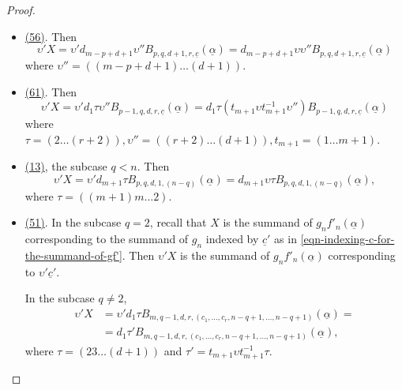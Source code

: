 \documentclass[12pt,a4paper,reqno]{amsart}
\begin{document}
\begin{proof}
\begin{itemize}
$$ \upsilon' X = 
\upsilon' d_{r+1} \tau B_{p, q, d, r,\underline{c}}(\underline{\alpha})
= 
d_{r+1} \tau \upsilon B_{p, q, d,
r,\underline{c}}(\underline{\alpha}), $$
where $\tau = \left((r+1)(r+2)\right)$. 
\item \underline{(56)}. Then 
$$ \upsilon' X = 
\upsilon' d_{m-p+d+1} \upsilon'' B_{p, q, d+1, r, \underline{c}}
(\underline{\alpha})
= d_{m-p+d+1} \upsilon \upsilon'' B_{p, q, d+1, r, \underline{c}}
(\underline{\alpha}) $$
where $\upsilon'' = \left((m-p+d+1)\dots(d+1)\right).$
\item \underline{(61)}. Then
$$ \upsilon' X = 
\upsilon' d_1 \tau \upsilon'' B_{p-1, q, d, r, \underline{c}} (\underline{\alpha})
=
d_1 \tau (t_{m+1} \upsilon t_{m+1}^{-1} \upsilon'')  B_{p-1, q, d, r, \underline{c}} (\underline{\alpha})
$$
where $\tau = \left(2\dots(r+2)\right), 
\upsilon'' = \left((r+2)\dots(d+1)\right), t_{m+1} = (1\dots{m+1}).$
\item \underline{(13)}, the subcase $q < n$.
Then 
$$ \upsilon' X =
\upsilon'
d_{m+1} \tau B_{p, q, d, 1, (n-q)}(\underline{\alpha})
= d_{m+1} \upsilon \tau B_{p, q, d, 1, (n-q)}(\underline{\alpha}), $$
where $\tau = \left((m+1)m\dots2\right)$.

\item \underline{(51)}. In the subcase $q = 2$, recall that
$X$ is the summand of $g_n f'_n(\underline{\alpha})$ 
corresponding to the summand of $g_n$ indexed by $\underline{c}'$
as in \eqref{eqn-indexing-c-for-the-summand-of-gf'}. 
Then $\upsilon' X$ is the summand of 
$g_n f'_n(\underline{\alpha})$ corresponding to $\upsilon' \underline{c}'$. 

In the subcase $q \neq 2$, 
\begin{align*}
\upsilon' X & = 
\upsilon' d_{1} \tau B_{m,q-1,d,r,(c_1, \dots, c_r, n-q+1, \dots,
n-q+1)}(\underline{\alpha}) = \\
& = 
d_{1} \tau' B_{m,q-1,d,r,(c_1, \dots, c_r, n-q+1, \dots,
n-q+1)}(\underline{\alpha}),
\end{align*}
where $\tau = (23\dots(d+1))$ and $\tau' = t_{m+1} \upsilon
t_{m+1}^{-1} \tau$. 
\end{itemize}
 

\end{proof}
\end{document}
